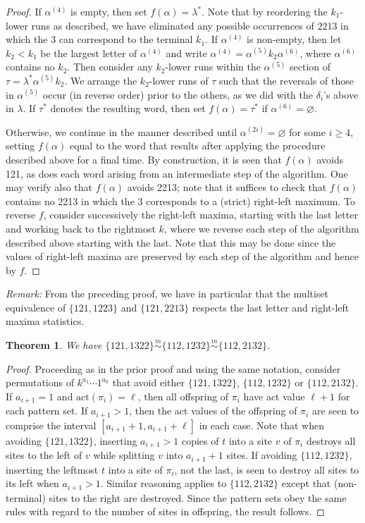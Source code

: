 \documentclass[11pt]{amsart}
\theoremstyle{plain}
\newtheorem{theorem}{Theorem}[section]
\theoremstyle{definition}
\newcommand{\csim}{\stackrel{m}{\sim}}
\begin{document}
\begin{proof}
If $\alpha^{(4)}$ is empty, then set $f(\alpha)=\lambda^*$.  Note that by reordering the $k_1$-lower
runs as described, we have eliminated any possible occurrences of $2213$ in which the $3$ can
correspond to the terminal $k_1$.  If $\alpha^{(4)}$ is non-empty, then let $k_2<k_1$ be the largest
letter of $\alpha^{(4)}$ and write $\alpha^{(4)}=\alpha^{(5)}k_2\alpha^{(6)}$, where $\alpha^{(6)}$
contains no $k_2$.  Then consider any $k_2$-lower runs within the $\alpha^{(5)}$ section of
$\tau=\lambda^*\alpha^{(5)}k_2$.  We arrange the $k_2$-lower runs of $\tau$ such that the reversals
of those in $\alpha^{(5)}$ occur (in reverse order) prior to the others, as we did with the
$\delta_i$'s above in $\lambda$.  If $\tau^*$ denotes the resulting word, then set $f(\alpha)=\tau^*$
if $\alpha^{(6)}=\varnothing$.

Otherwise, we continue in the manner described until $\alpha^{(2i)}=\varnothing$ for some $i \geq
4$, setting $f(\alpha)$ equal to the word that results after applying the procedure described above
for a final time.  By construction, it is seen that $f(\alpha)$ avoids 121, as does each word arising
from an intermediate step of the algorithm.  One may verify also that $f(\alpha)$ avoids 2213; note
that it suffices to check that $f(\alpha)$ contains no 2213 in which the 3 corresponds to a (strict)
right-left maximum.  To reverse $f$, consider successively the right-left maxima, starting with the
last letter and working back to the rightmost $k$, where we reverse each step of the algorithm
described above starting with the last.  Note that this may be done since the values of right-left
maxima are preserved by each step of the algorithm and hence by $f$.
\end{proof}

\emph{Remark:} From the preceding proof, we have in particular that the multiset equivalence of
$\{121,1223\}$ and $\{121,2213\}$ respects the last letter and right-left maxima statistics.
\medskip

\begin{theorem}\label{121,1322}
We have $\{121,1322\}\csim\{112,1232\}\csim\{112,2132\}$.
\end{theorem}
\begin{proof}
Proceeding as in the prior proof and using the same notation, consider permutations of
$k^{a_1}\cdots 1^{a_k}$ that avoid either $\{121,1322\}$, $\{112,1232\}$ or $\{112,2132\}$. If
$a_{i+1}=1$ and $\text{act}(\pi_i)=\ell$, then all offspring of $\pi_i$ have act value $\ell+1$ for
each pattern set.  If $a_{i+1}>1$, then the act values of the offspring of $\pi_i$ are seen to
comprise the interval $[a_{i+1}+1,a_{i+1}+\ell]$ in each case.  Note that when avoiding
$\{121,1322\}$, inserting $a_{i+1}>1$ copies of $t$ into a site $v$ of $\pi_i$ destroys all sites to
the left of $v$ while splitting $v$ into $a_{i+1}+1$ sites. If avoiding $\{112,1232\}$, inserting the
leftmost $t$ into a site of $\pi_i$, not the last, is seen to destroy all sites to its left when
$a_{i+1}>1$. Similar reasoning applies to $\{112,2132\}$ except that (non-terminal) sites to the right are
destroyed. Since the pattern sets obey the same rules with regard to the number of sites in
offspring, the result follows.
\end{proof}
\end{document}
